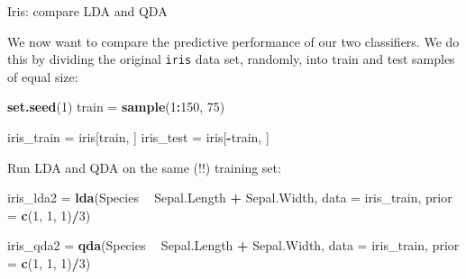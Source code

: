 \documentclass[10pt,ignorenonframetext,]{beamer}
\newenvironment{Shaded}{\begin{snugshade}}{\end{snugshade}}
\newcommand{\KeywordTok}[1]{\textcolor[rgb]{0.13,0.29,0.53}{\textbf{#1}}}
\newcommand{\DataTypeTok}[1]{\textcolor[rgb]{0.13,0.29,0.53}{#1}}
\newcommand{\DecValTok}[1]{\textcolor[rgb]{0.00,0.00,0.81}{#1}}
\newcommand{\StringTok}[1]{\textcolor[rgb]{0.31,0.60,0.02}{#1}}
\newcommand{\OperatorTok}[1]{\textcolor[rgb]{0.81,0.36,0.00}{\textbf{#1}}}
\newcommand{\NormalTok}[1]{#1}
\begin{document}
\begin{frame}[fragile]

\begin{block}{Iris: compare LDA and QDA}

\vspace{2mm}

We now want to compare the predictive performance of our two
classifiers. We do this by dividing the original \texttt{iris} data set,
randomly, into train and test samples of equal size:

\scriptsize

\begin{Shaded}
\begin{Highlighting}[]
\KeywordTok{set.seed}\NormalTok{(}\DecValTok{1}\NormalTok{)}
\NormalTok{train =}\StringTok{ }\KeywordTok{sample}\NormalTok{(}\DecValTok{1}\OperatorTok{:}\DecValTok{150}\NormalTok{, }\DecValTok{75}\NormalTok{)}

\NormalTok{iris_train =}\StringTok{ }\NormalTok{iris[train, ]}
\NormalTok{iris_test =}\StringTok{ }\NormalTok{iris[}\OperatorTok{-}\NormalTok{train, ]}
\end{Highlighting}
\end{Shaded}

\normalsize

Run LDA and QDA on the same (!!) training set:

\scriptsize

\begin{Shaded}
\begin{Highlighting}[]
\NormalTok{iris_lda2 =}\StringTok{ }\KeywordTok{lda}\NormalTok{(Species }\OperatorTok{~}\StringTok{ }\NormalTok{Sepal.Length }\OperatorTok{+}\StringTok{ }\NormalTok{Sepal.Width, }\DataTypeTok{data =}\NormalTok{ iris_train, }
    \DataTypeTok{prior =} \KeywordTok{c}\NormalTok{(}\DecValTok{1}\NormalTok{, }\DecValTok{1}\NormalTok{, }\DecValTok{1}\NormalTok{)}\OperatorTok{/}\DecValTok{3}\NormalTok{)}

\NormalTok{iris_qda2 =}\StringTok{ }\KeywordTok{qda}\NormalTok{(Species }\OperatorTok{~}\StringTok{ }\NormalTok{Sepal.Length }\OperatorTok{+}\StringTok{ }\NormalTok{Sepal.Width, }\DataTypeTok{data =}\NormalTok{ iris_train, }
    \DataTypeTok{prior =} \KeywordTok{c}\NormalTok{(}\DecValTok{1}\NormalTok{, }\DecValTok{1}\NormalTok{, }\DecValTok{1}\NormalTok{)}\OperatorTok{/}\DecValTok{3}\NormalTok{)}
\end{Highlighting}
\end{Shaded}

\end{block}

\end{frame}
\end{document}
